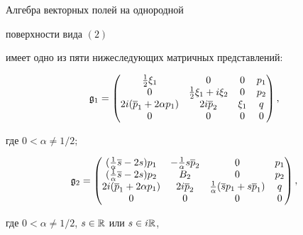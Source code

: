\begin{thm}


Алгебра векторных полей на однородной 


поверхности вида $(2)$ 


имеет одно из пяти нижеследующих матричных представлений\/${:}$


\begin{equation}


\frak g_1 =


\begin{pmatrix}


 \frac1{2} \xi_1 & 0 & 0 & p_1 \\


0 & \frac1{2}\xi_1 + i \xi_2 & 0 & p_2\\ 


2i (\overline p_1 + 2 \alpha p_1) & 2 i \overline p_2 & \xi_1 & q \\


0&0&0&0 


\end{pmatrix}


,


\end{equation}


где $ 0 < \alpha \ne 1/2;$


\begin{equation}


\frak g_2 =


\begin{pmatrix}


( \frac1{\alpha} \overline s - 2 s ) p_1 & -\frac1{\alpha} s \overline p_2


 & 0 & p_1 \\


( \frac1{\alpha} \overline s - 2 s ) p_2 


& B_2 & 0 & p_2\\ 


2i (\overline p_1 + 2 \alpha p_1) & 2 i \overline p_2 & 


 \frac 1{\alpha} ( \overline s p_1 + s \overline p_1 ) & q \\


0&0&0&0 


\end{pmatrix}


,


\end{equation}


где $ 0 < \alpha \ne 1/2 $, $ s \in \Bbb R $ или $ s \in i \Bbb R $,



\end{thm}
